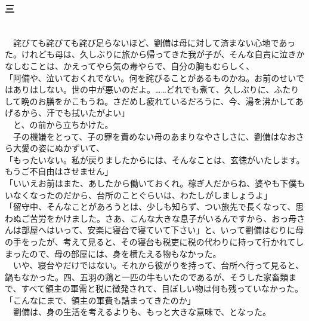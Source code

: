 \documentclass[
  paper=a5,
  fontsize=10pt,
  jafontsize=9.5pt,
  tate,                  %
  open_bracket_pos=nibu, %
]{jlreq}
\begin{document}
\subsubsection{三}

\\


　詫びても詫びても詫び足らないほど、劉備は母に対して済まない心地であった。けれども母は、久しぶりに旅から帰ってきた我が子が、そんな自責に泣きかなしむことは、かえってやら気の毒やらで、自分の胸もむらしく、\\


「阿備や、泣いておくれでない。何を詫びることがあるものかね。お前のせいではありはしない。世の中が悪いのだよ。……どれでも煮て、久しぶりに、ふたりして晩のお膳をかこもうね。さだめし疲れているだろうに、今、湯を沸かしてあげるから、汗でも拭いたがよい」\\


　と、の前から立ちかけた。\\


　子の機嫌をとって、子の罪を責めない母のあまりなやさしさに、劉備はなおさら大愛の姿にぬかずいて、\\


「もったいない。私が戻りましたからには、そんなことは、玄徳がいたします。もうご不自由はさせません」\\


「いいえお前はまた、あしたから働いておくれ。稼ぎ人だからね、婆やも下僕もいなくなったのだから、台所のことぐらいは、わたしがしましょうよ」\\


「留守中、そんなことがあろうとは、少しも知らず、つい旅先で長くなって、思わぬご苦労をかけました。さあ、こんな大きな息子がいるんですから、おっ母さんは部屋へはいって、安楽に寝台で寝ていて下さい」と、いって劉備はむりに母の手をったが、考えて見ると、その寝台も税吏に税の代わりに持って行かれてしまったので、母の部屋には、身を横たえる物もなかった。\\


　いや、寝台やだけではない。それから彼がりを持って、台所へ行って見ると、鍋もなかった。四、五羽の鶏と一匹の牛もいたのであるが、そうした家畜類まで、すべて領主の軍需と税に徴発されて、目ぼしい物は何も残っていなかった。\\


「こんなにまで、領主の軍費も詰まってきたのか」\\


　劉備は、身の生活を考えるよりも、もっと大きな意味で、となった。\\
\end{document}
